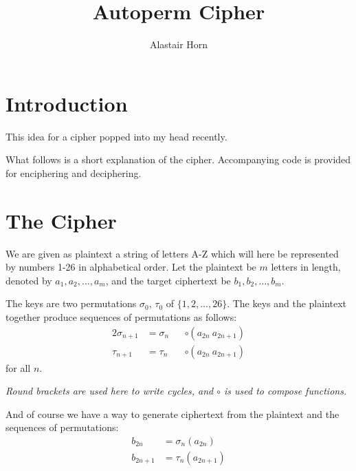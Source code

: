\documentclass{article}
\title{Autoperm Cipher}
\author{Alastair Horn}
\begin{document}
\maketitle

\section*{Introduction}

This idea for a cipher popped into my head recently.

What follows is a short explanation of the cipher. Accompanying code is provided
for enciphering and deciphering.

\section*{The Cipher}

We are given as plaintext a string of letters A-Z which will here be represented
by numbers 1-26 in alphabetical order. Let the plaintext be \(m\) letters in
length, denoted by \(a_1, a_2, \dotsc, a_m\), and the target ciphertext be
\(b_1, b_2, \dotsc, b_m\).

The keys are two permutations \(\sigma_0\), \(\tau_0\) of
\(\{1, 2, \dotsc, 26\}\). The keys and the plaintext together produce sequences
of permutations as follows:
\begin{alignat*}2
 \sigma_{n + 1} &= \sigma_n && \circ (a_{2n}\ a_{2n + 1}) \\
 \tau_{n + 1}   &= \tau_n   && \circ (a_{2n}\ a_{2n + 1})
\end{alignat*}
for all \(n\).

\emph{Round brackets are used here to write cycles, and \(\circ\) is used to
compose functions.}

And of course we have a way to generate ciphertext from the plaintext and the
sequences of permutations:
\begin{align*}
 b_{2n}     &= \sigma_n(a_{2n}) \\
 b_{2n + 1} &= \tau_n (a_{2n + 1})
\end{align*}
\end{document}
